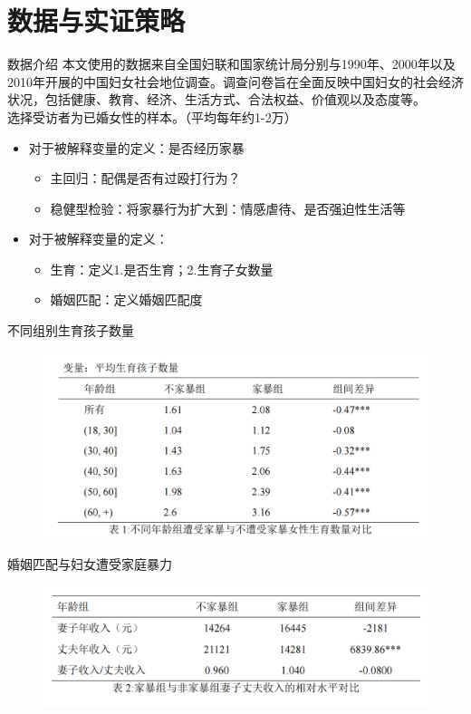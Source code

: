 \documentclass{beamer}
\begin{document}
\section{数据与实证策略}
\begin{frame}{数据介绍}
    本文使用的数据来自全国妇联和国家统计局分别与1990年、2000年以及2010年开展的中国妇女社会地位调查。调查问卷旨在全面反映中国妇女的社会经济状况，包括健康、教育、经济、生活方式、合法权益、价值观以及态度等。\\
    选择受访者为已婚女性的样本。（平均每年约1-2万）
    \begin{itemize}[<+-| alert@+>] 
        \item 对于被解释变量的定义：是否经历家暴
        \begin{itemize}
            \item 主回归：配偶是否有过殴打行为？
            \item 稳健型检验：将家暴行为扩大到：情感虐待、是否强迫性生活等
        \end{itemize}
        \item 对于被解释变量的定义：
        \begin{itemize}
            \item 生育：定义1.是否生育；2.生育子女数量
            \item 婚姻匹配：定义婚姻匹配度
        \end{itemize}
    \end{itemize}
\end{frame}

\begin{frame}{不同组别生育孩子数量}
    \begin{figure}
        \includegraphics[scale=0.35]{1.png}
    \end{figure}
\end{frame}

\begin{frame}{婚姻匹配与妇女遭受家庭暴力}
    \begin{figure}
        \includegraphics[scale=0.35]{2.png}
    \end{figure}
\end{frame}
\end{document}
